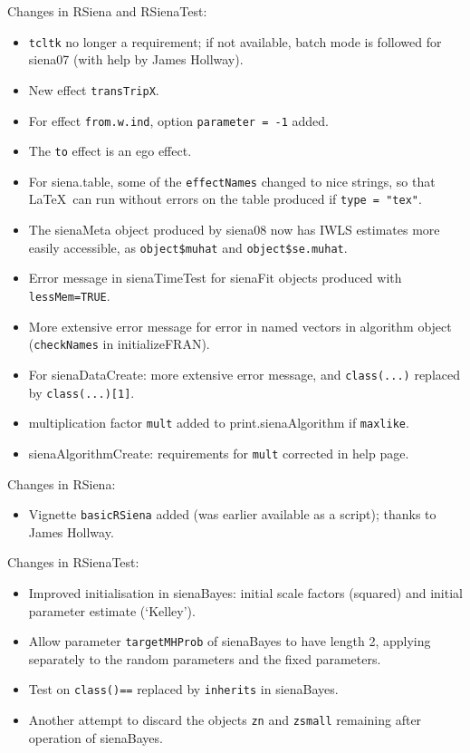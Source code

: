 \documentclass[a4paper,fleqn,11pt]{article}
\newcommand{\+}{\, + \,}
\newcommand{\sfn}[1]{\textsf{#1}}
\begin{document}
\begin{small}
\begin{itemize}
Changes in \textsf{RSiena} and \textsf{RSienaTest}:
\begin{itemize}
   \item \texttt{tcltk} no longer a requirement; if not available,
        batch mode is followed for \textsf{siena07} (with help
        by James Hollway).
   \item New effect \texttt{transTripX}.
   \item For effect \texttt{from.w.ind}, option \texttt{parameter = -1} added.
   \item The \texttt{to} effect is an ego effect.
   \item For \textsf{siena.table}, some of the \texttt{effectNames} changed to nice strings,
     so that \LaTeX\ can run without errors
     on the table produced if \texttt{type = "tex"}.
   \item The \sfn{sienaMeta} object produced by \textsf{siena08} now has IWLS estimates more easily
     accessible, as \texttt{object\$muhat} and \texttt{object\$se.muhat}.
   \item Error message in \textsf{sienaTimeTest} for \sfn{sienaFit} objects produced with
     \texttt{lessMem=TRUE}.
   \item More extensive error message for error in named vectors in algorithm object
     (\texttt{checkNames} in \sfn{initializeFRAN}).
   \item For \textsf{sienaDataCreate}: more extensive error message, and \texttt{class(...)} replaced
     by \texttt{class(...)[1]}.
   \item multiplication factor \texttt{mult}
     added to \sfn{print.sienaAlgorithm} if \texttt{maxlike}.
   \item \textsf{sienaAlgorithmCreate}: requirements for \texttt{mult} corrected in help page.
\end{itemize}

Changes in RSiena:
\begin{itemize}
\item Vignette \texttt{basicRSiena} added (was earlier available as a script);
     thanks to James Hollway.
\end{itemize}

Changes in \textsf{RSienaTest}:
\begin{itemize}
   \item Improved initialisation in \textsf{sienaBayes}: initial scale factors (squared)
     and initial parameter estimate (`Kelley').
   \item Allow parameter \texttt{targetMHProb} of \textsf{sienaBayes} to have length 2,
        applying separately to the random parameters and the fixed parameters.
   \item Test on \texttt{class()==} replaced by \texttt{inherits} in \textsf{sienaBayes}.
   \item Another attempt to discard the objects \texttt{zn} and \texttt{zsmall} remaining after operation
     of \textsf{sienaBayes}.
\end{itemize}





\end{itemize}
\end{small}
\end{document}
